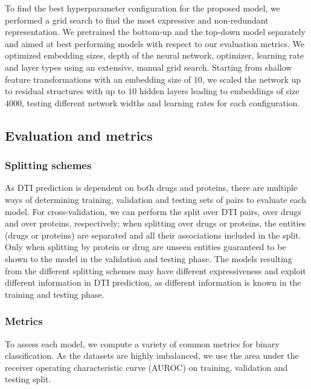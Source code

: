 \documentclass{bioinfo}
\begin{document}
To find the best hyperparameter configuration for the proposed model,
we performed a grid search to find the most expressive and
non-redundant representation. We pretrained the bottom-up and the
top-down model separately and aimed at best performing models with
respect to our evaluation metrics. We optimized embedding sizes, depth
of the neural network, optimizer, learning rate and layer types using
an extensive, manual grid search. Starting from shallow feature
transformations with an embedding size of $10$, we scaled the network
up to residual structures with up to $10$ hidden layers leading to
embeddings of size $4000$, testing different network widths and
learning rates for each configuration.

\subsection{Evaluation and metrics}

\subsubsection{Splitting schemes}

As DTI prediction is dependent on both drugs and proteins, there are
multiple ways of determining training, validation and testing sets of
pairs to evaluate each model. For cross-validation, we can perform the
split over DTI pairs, over drugs and over proteins, respectively; when
splitting over drugs or proteins, the entities (drugs or proteins) are
separated and all their associations included in the split.
Only when splitting by protein or drug are unseen entities guaranteed to
be shown to the model in the validation and testing
phase. The models resulting from the different splitting schemes may
have different expressiveness and exploit different information in DTI
prediction, as different information is known in the training and
testing phase.

\subsubsection{Metrics}
\label{sec:evaluation}
To assess each model, we compute a variety of common metrics for
binary classification. As the datasets are highly imbalanced, we use
the area under the receiver operating characteristic curve (AUROC) on
training, validation and testing split.
\end{document}
